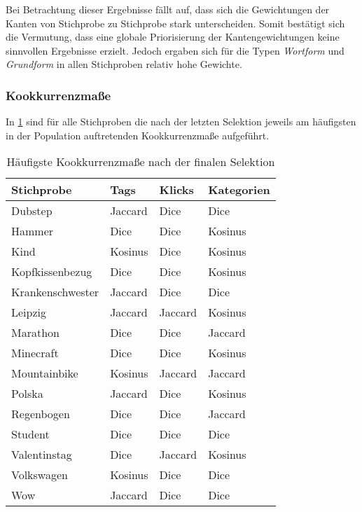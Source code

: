 Bei Betrachtung dieser Ergebnisse fällt auf, dass sich die Gewichtungen der Kanten von Stichprobe zu Stichprobe stark unterscheiden. Somit bestätigt sich die Vermutung, dass eine globale Priorisierung der Kantengewichtungen keine sinnvollen Ergebnisse erzielt. Jedoch ergaben sich für die Typen \emph{Wortform} und \emph{Grundform} in allen Stichproben relativ hohe Gewichte.

\clearpage

\subsubsection{Kookkurrenzmaße}

In \cref{tab:measures_each} sind für alle Stichproben die nach der letzten Selektion jeweils am häufigsten in der Population auftretenden Kookkurrenzmaße aufgeführt.

\begin{table}[h]
\centering
\begin{tabular}{llll}
    \toprule
    Stichprobe & Tags & Klicks & Kategorien \\
    \midrule
    Dubstep & Jaccard & Dice & Dice \\
    Hammer & Dice & Dice & Kosinus \\
    Kind & Kosinus & Dice & Kosinus \\
    Kopfkissenbezug & Dice & Dice & Kosinus \\
    Krankenschwester & Jaccard & Dice & Dice \\
    Leipzig & Jaccard & Jaccard & Kosinus \\
    Marathon & Dice & Dice & Jaccard \\
    Minecraft & Dice & Dice & Kosinus \\
    Mountainbike & Kosinus & Jaccard & Jaccard \\
    Polska & Jaccard & Dice & Kosinus \\
    Regenbogen & Dice & Dice & Jaccard \\
    Student & Dice & Dice & Dice \\
    Valentinstag & Dice & Jaccard & Kosinus \\
    Volkswagen & Kosinus & Dice & Dice \\
    Wow & Jaccard & Dice & Dice \\
    \bottomrule
\end{tabular}
\caption{Häufigste Kookkurrenzmaße nach der finalen Selektion}
\label{tab:measures_each}
\end{table}

